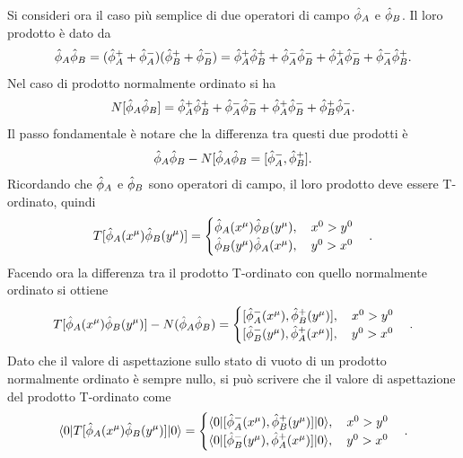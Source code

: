 Si consideri ora il caso più semplice di due operatori di campo $\hat{\phi}_A$ e $\hat{\phi}_B$. Il loro prodotto è dato da 
\begin{equation}
    \hat{\phi}_A\hat{\phi}_B=(\hat{\phi}_A^++\hat{\phi}_A^-)(\hat{\phi}_B^++\hat{\phi}_B^-)=\hat{\phi}_A^+\hat{\phi}_B^++\hat{\phi}_A^-\hat{\phi}_B^-+\hat{\phi}_A^+\hat{\phi}_B^-+\hat{\phi}_A^-\hat{\phi}_B^+.
\end{equation}
Nel caso di prodotto normalmente ordinato si ha
\begin{equation}
    N[\hat{\phi}_A\hat{\phi}_B]=\hat{\phi}_A^+\hat{\phi}_B^++\hat{\phi}_A^-\hat{\phi}_B^-+\hat{\phi}_A^+\hat{\phi}_B^-+\hat{\phi}_B^+\hat{\phi}_A^-.
\end{equation}
Il passo fondamentale è notare che la differenza tra questi due prodotti è
\begin{equation}
    \hat{\phi}_A\hat{\phi}_B-N[\hat{\phi}_A\hat{\phi}_B=[\hat{\phi}_A^-,\hat{\phi}_B^+].
\end{equation}
Ricordando che $\hat{\phi}_A$ e $\hat{\phi}_B$ sono operatori di campo, il loro prodotto deve essere T-ordinato, quindi
\begin{equation}
    T[\hat{\phi}_A(x^\mu)\hat{\phi}_B(y^\mu)]=
    \begin{cases}
        \hat{\phi}_A(x^\mu)\hat{\phi}_B(y^\mu),\quad x^0>y^0 \\
        \hat{\phi}_B(y^\mu)\hat{\phi}_A(x^\mu),\quad y^0>x^0
    \end{cases}.
\end{equation}
Facendo ora la differenza tra il prodotto T-ordinato con quello normalmente ordinato si ottiene
\begin{equation}
    T[\hatphi_A(x^\mu)\hatphi_B(y^\mu)]-N(\hatphi_A\hatphi_B)=
    \begin{cases}
        \comm{\hatphi_A^-(x^\mu)}{\hatphi_B^+(y^\mu)},\quad x^0>y^0 \\
        \comm{\hatphi_B^-(y^\mu)}{\hatphi_A^+(x^\mu)},\quad y^0>x^0
    \end{cases}.
\end{equation}
Dato che il valore di aspettazione sullo stato di vuoto di un prodotto normalmente ordinato è sempre nullo, si può scrivere che il valore di aspettazione del prodotto T-ordinato come
\begin{equation}
    \langle 0 | T[\hat{\phi}_A(x^\mu)\hat{\phi}_B(y^\mu)] | 0 \rangle=
    \begin{cases}
        \langle 0 | [\hat{\phi}_A^-(x^\mu),\hat{\phi}_B^+(y^\mu)] | 0 \rangle,\quad x^0>y^0 \\
        \langle 0 | [\hat{\phi}_B^-(y^\mu),\hat{\phi}_A^+(x^\mu)] | 0 \rangle,\quad y^0>x^0
    \end{cases}.
\end{equation}
